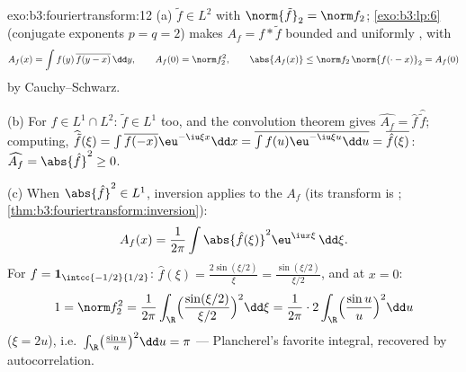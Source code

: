 \begin{solution}{exo:b3:fouriertransform:12}
(a) $\tilde f \in L^2$ with $\norm{\tilde f}_2 = \norm f_2$;
\cref{exo:b3:lp:6} (conjugate exponents $p = q = 2$) makes
$A_f = f * \tilde f$ bounded and uniformly , with
\[
A_f(x) = \int f(y)\,\overline{f(y - x)}\,\dd y,
\qquad A_f(0) = \norm f_2^2,
\qquad \abs{A_f(x)} \leq \norm f_2\,\norm{f(\cdot -
x)}_2 = A_f(0)
\]
by Cauchy--Schwarz.

(b) For $f \in L^1\cap L^2$: $\tilde f \in L^1$ too, and the
convolution theorem gives $\widehat{A_f} = \hat f\,
\widehat{\tilde f}$; computing, $\widehat{\tilde f}(\xi) =
\int\overline{f(-x)}\eu^{-\iu\xi x}\dd x =
\overline{\int f(u)\eu^{-\iu\xi u}\dd u} =
\overline{\hat f(\xi)}$: $\widehat{A_f} = \abs{\hat f}^2
\geq 0$.

(c) When $\abs{\hat f}^2 \in L^1$, inversion applies to the
 $A_f$ (its transform is ;
\cref{thm:b3:fouriertransform:inversion}):
\[
A_f(x) = \frac1{2\pi}\int\abs{\hat f(\xi)}^2
\eu^{\iu x\xi}\,\dd\xi .
\]
For $f = \mathbf 1_{\intcc{-1/2}{1/2}}$: $\hat f(\xi) =
\frac{2\sin(\xi/2)}\xi = \frac{\sin(\xi/2)}{\xi/2}$, and at
$x = 0$:
\[
1 = \norm f_2^2 = \frac1{2\pi}\int_\R
\Bigl(\frac{\sin(\xi/2)}{\xi/2}\Bigr)^2\dd\xi
= \frac1{2\pi}\cdot2\int_\R\Bigl(\frac{\sin u}u\Bigr)^2\dd u
\]
($\xi = 2u$), i.e.\ $\int_\R\bigl(\frac{\sin u}u\bigr)^2\dd
u = \pi$ --- Plancherel's favorite integral, recovered by
autocorrelation.
\end{solution}

